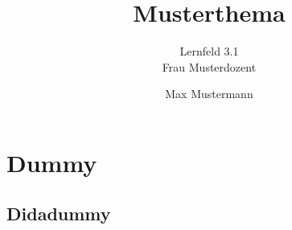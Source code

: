 \documentclass{hausarbeit}
\begin{document}
\author{Max Mustermann}
\title{Musterthema}
\subtitle{Lernfeld 3.1\\Frau Musterdozent}
\maketitle
\newpage
\tableofcontents
\newpage
\section{Dummy}
\subsection{Didadummy}
\lipsum
\newpage

\end{document}
